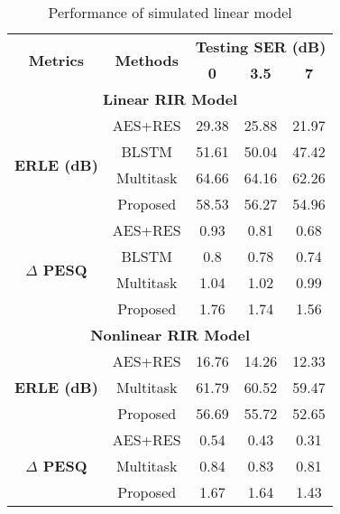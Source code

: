 \documentclass{article}
\begin{document}
\begin{sloppy}
\begin{table}[htb]
\setlength{\abovecaptionskip}{0.2cm}
\setlength{\belowcaptionskip}{0.2cm}
\centering
\caption{Performance of simulated linear model}
\label{tab:linear}
\begin{tabular}{|c|c|c|c|c|}
\hline
\multirow{2}{*}{\textbf{Metrics}}     & \multirow{2}{*}{\textbf{Methods}} & \multicolumn{3}{c|}{\textbf{Testing SER (dB)}} \\ \cline{3-5}
                      &       & \textbf{0}     & \textbf{3.5}    & \textbf{7}           \\ \hline \hline
\multicolumn{5}{|c|}{\textbf{Linear RIR Model}}  \\ \hline \hline
\multirow{4}{*}{\textbf{ERLE (dB)}} & AES+RES                 & 29.38       & 25.88       & 21.97       \\ \cline{2-5}
                      & BLSTM    & 51.61   & 50.04  & 47.42       \\ \cline{2-5}
                      & Multitask   & 64.66    & 64.16   & 62.26    \\ \cline{2-5}
                      & Proposed   & 58.53   & 56.27  & 54.96      \\ \hline
\multirow{4}{*}{\textbf{$\Delta$ PESQ}} & AES+RES & 0.93 & 0.81 & 0.68 \\ \cline{2-5}
                      & BLSTM      & 0.8    & 0.78   & 0.74        \\ \cline{2-5}
                      & Multitask   & 1.04  & 1.02   & 0.99      \\ \cline{2-5}
                      & Proposed    & 1.76  & 1.74  & 1.56     \\ \hline
\hline
\multicolumn{5}{|c|}{\textbf{Nonlinear RIR Model}}  \\ \hline \hline
\multirow{3}{*}{\textbf{ERLE (dB)}} & AES+RES & 16.76 & 14.26 & 12.33 \\ \cline{2-5}
                      & Multitask     & 61.79   & 60.52   & 59.47  \\ \cline{2-5}
                      & Proposed     & 56.69   & 55.72  & 52.65  \\ \hline
\multirow{3}{*}{\textbf{$\Delta$ PESQ}} & AES+RES & 0.54 & 0.43 & 0.31 \\ \cline{2-5}
                      & Multitask       & 0.84   & 0.83    & 0.81  \\ \cline{2-5}
                      & Proposed       & 1.67    & 1.64   & 1.43     \\ \hline
\end{tabular}
\end{table}


\end{sloppy}
\end{document}
